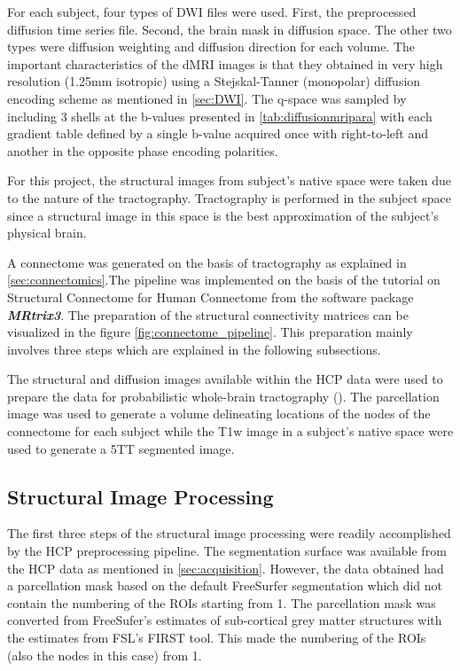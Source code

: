 \documentclass[msthesis.tex]{subfiles}
\begin{document}
For each subject, four types of DWI files were used. First, the preprocessed diffusion time series file. Second, the brain mask in diffusion space. The other two types were diffusion weighting and diffusion direction for each volume. The important characteristics of the dMRI images is that they obtained in very high resolution (1.25mm isotropic) using a Stejskal-Tanner (monopolar) diffusion encoding scheme as mentioned in \autoref{sec:DWI}. The q-space was sampled by including 3 shells at the b-values presented in \autoref{tab:diffusionmripara} with each gradient table defined by a single b-value acquired once with right-to-left and another in the opposite phase encoding polarities. 

For this project, the structural images from subject's native space were taken due to the nature of the tractography. Tractography is performed in the subject space since a structural image in this space is the best approximation of the subject's physical brain. 

A connectome was generated on the basis of tractography as explained in \autoref{sec:connectomics}.The pipeline was implemented on the basis of the tutorial on Structural Connectome for Human Connectome from the software package \textbf{\textit{MRtrix3}}. The preparation of the structural connectivity matrices can be visualized in the figure \autoref{fig:connectome_pipeline}. This preparation mainly involves three steps which are explained in the following subsections.

The structural and diffusion images available within the \gls{HCP} data were used to prepare the data for probabilistic whole-brain tractography (\cite{parker2003framework}). The parcellation image was used to generate a volume delineating locations of the nodes of the connectome for each subject while the T1w image in a subject's native space were used to generate a \gls{5TT} segmented image.

\subsection{Structural Image Processing}
\label{subsec:struct_diff}

The first three steps of the structural image processing were readily accomplished by the \gls{HCP} preprocessing pipeline. The segmentation surface was available from the \gls{HCP} data as mentioned in \autoref{sec:acquisition}. However, the data obtained had a parcellation mask based on the default FreeSurfer segmentation which did not contain the numbering of the ROIs starting from 1. The parcellation mask was converted from FreeSufer's estimates of sub-cortical grey matter structures with the estimates from FSL's FIRST tool. This made the numbering of the ROIs (also the nodes in this case) from 1. 
\end{document}
